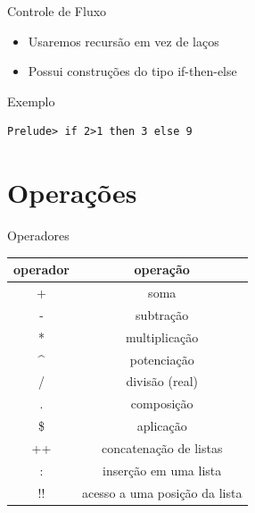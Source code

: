 \documentclass{beamer}
\begin{document}
	\begin{frame}[fragile]{Controle de Fluxo}
		\begin{itemize}
		 \item Usaremos recursão em vez de laços
		 \item Possui construções do tipo if-then-else
		\end{itemize}
		
		\begin{block}{Exemplo}
		 \begin{lstlisting}
Prelude> if 2>1 then 3 else 9
		 \end{lstlisting}
		\end{block}
	\end{frame}
	
	\section{Operações}
	
	\begin{frame}{}
	\end{frame}
	
	\begin{frame}{Operadores}
	 \begin{table}[h]
	  \centering
	  \begin{tabular}{c | c}
			\hline
			operador & operação\\
			\hline
			+ & soma \\
			- & subtração \\
			* & multiplicação\\
			\textasciicircum & potenciação\\
			/ & divisão (real)\\
			. & composição \\
			\$ & aplicação \\
			++ & concatenação de listas\\
			: & inserção em uma lista\\
			!! & acesso a uma posição da lista\\			
			\hline
	  \end{tabular}
	 \end{table}	 
	\end{frame}
	
\end{document}
